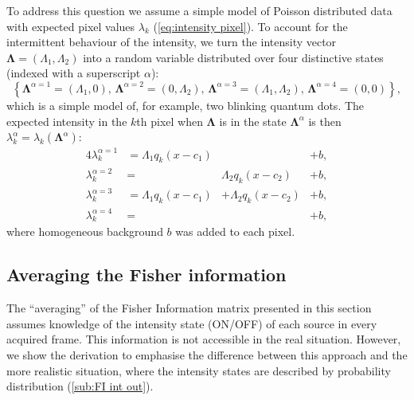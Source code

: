 To address this question we assume a simple model of Poisson distributed data with expected pixel values $\lambda_k$ (\autoref{eq:intensity pixel}). To account for the intermittent behaviour of the intensity, we turn the intensity vector $\bm{\Lambda}=(\Lambda_1,\Lambda_2)$ into a random variable distributed over four distinctive states (indexed with a superscript $\alpha$):
%
\begin{equation}
	\left\{ \bm{\Lambda}^{\alpha=1}=(\Lambda_1,0),\,\bm{\Lambda}^{\alpha=2}=(0,\Lambda_2),\,\bm{\Lambda}^{\alpha=3}=(\Lambda_1,\Lambda_2),\,\bm{\Lambda}^{\alpha=4}=(0,0)\right\},
	\label{eq:intensity states}
\end{equation}
%
which is a simple model of, for example, two blinking quantum dots. The expected intensity in the $k$th pixel when $\bm{\Lambda}$ is in the state $\bm{\Lambda}^\alpha$ is then $\lambda_k^\alpha=\lambda_k(\bm{\Lambda}^\alpha)$:
%
\begin{alignat}{4}
	\lambda_k^{\alpha=1}&=\Lambda_1q_k(x-c_1) & &+b,\nonumber\\ 
	\lambda_k^{\alpha=2}&=&\Lambda_2q_k(x-c_2) &+b,\nonumber\\ 
	\lambda_k^{\alpha=3}&=\Lambda_1q_k(x-c_1)&+\Lambda_2q_k(x-c_2)&+b,\nonumber\\ 
	\lambda_k^{\alpha=4}&=& &+b,
	\label{eq:lambda states}
\end{alignat}
%
where homogeneous background $b$ was added to each pixel.

\subsection{Averaging the Fisher information\label{sub:avg FI}}

The ``averaging'' of the Fisher Information matrix presented in this section assumes knowledge of the intensity state (ON/OFF) of each source in every acquired frame. This information is not accessible in the real situation. However, we show the derivation to emphasise the difference between this approach and the more realistic situation, where the intensity states are described by probability distribution (\autoref{sub:FI int out}). 

